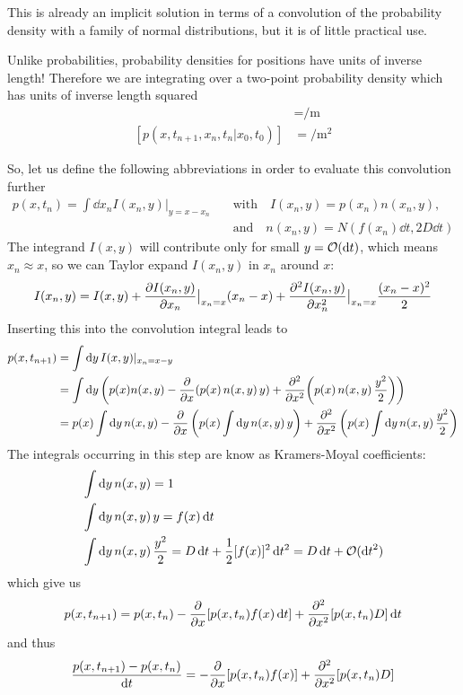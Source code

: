 \documentclass{notebook}
\begin{document}
This is already an implicit solution in terms of a convolution of the probability density with a family of normal distributions, but it is of little practical use. 
%
\begin{caveat}
	Unlike probabilities, probability densities for positions have units of inverse length! Therefore we are integrating over a two-point probability density which has units of inverse length squared
	\begin{align*}
		[p(x,t_{n+1}|x_0,t_0)] &= \si{\per \meter} \\
		[p(x,t_{n+1},x_n,t_n|x_0,t_0)] &= \si{\per \meter \squared}
	\end{align*}
\end{caveat}
%
So, let us define the following abbreviations in order to evaluate this convolution further 
%
\begin{align*}
	p(x,t_n) = \int \dd x_n I(x_n, y) |_{y = x-x_n} \quad &\mathrm{with} \quad I(x_n,y) = p(x_n) n(x_n,y), \\ 
	&\mathrm{and} \quad n(x_n,y) = N(f(x_n) \dd t, 2 D \dd t)
\end{align*}
%
The integrand $I(x,y)$ will contribute only for small $y = \mathcal{O}(\dd t)$, which means $x_n \approx x$, so we can Taylor expand $I(x_n,y)$ in $x_n$ around $x$:
%
\begin{equation}
I(x_n,y) = I(x,y) + \pdv{I(x_n,y)}{x_n} \big|_{x_n = x} (x_n-x) + \pdv[2]{I(x_n,y)}{x_n} \big|_{x_n = x} \frac{(x_n-x)^2}{2}
\end{equation}
%
Inserting this into the convolution integral leads to
%
\begin{align*}
	p(x,t_{n+1}) &= \int{\dd{y} I(x,y)|_{x_n = x-y}} \\
	&= \int\dd y \left( p(x) n(x,y) - \pdv{x} (p(x) \, n(x,y) \, y ) + \pdv[2]{x} (p(x) \, n(x,y) \, \frac{y^2}{2})\right) \\
	&= p(x) \int \dd{y} n(x,y) - \pdv{x} \left(p(x) \int \dd{y} n(x,y) \, y \right) + \pdv[2]{x} \left(p(x) \int \dd{y} n(x,y) \, \frac{y^2}{2} \right)
\end{align*}
%
The integrals occurring in this step are know as Kramers-Moyal coefficients:
%
\begin{align*}
	&\int \dd{y} n(x,y) = 1 \\
	&\int \dd{y} n(x,y) \, y = f(x) \dd{t} \\
	&\int \dd{y} n(x,y) \, \frac{y^2}{2} = D \dd{t} + \frac{1}{2}[f(x)]^2 \dd{t^2} = D \dd{t} + \mathcal{O}(\dd{t}^2)
\end{align*}
%
which give us
%
\begin{equation}
p(x,t_{n+1}) = p(x,t_n) - \pdv{x} [p(x,t_n) f(x) \dd{t}] + \pdv[2]{x}[p(x,t_n) D]\dd{t}
\end{equation}
%
and thus
%
\begin{equation}
\frac{p(x,t_{n+1}) - p(x,t_n)}{\dd{t}} =  -\pdv{x} [p(x,t_n) f(x)] + \pdv[2]{x}[p(x,t_n) D]
\end{equation}
%
\end{document}
